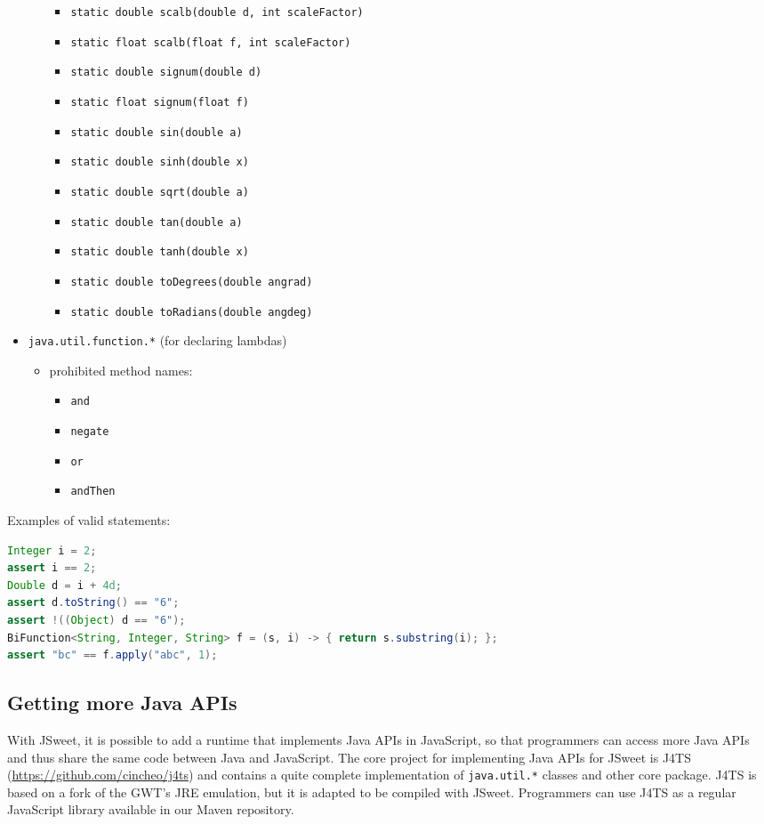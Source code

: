 \documentclass[a4paper]{report}
\begin{document}
\begin{itemize}
\begin{itemize}
\begin{itemize}
				\item \texttt{static double scalb(double d, int scaleFactor)}
				\item \texttt{static float scalb(float f, int scaleFactor)}
				\item \texttt{static double signum(double d)}
				\item \texttt{static float signum(float f)}
				\item \texttt{static double sin(double a)}
				\item \texttt{static double sinh(double x)}
				\item \texttt{static double sqrt(double a)}
				\item \texttt{static double tan(double a)}
				\item \texttt{static double tanh(double x)}
				\item \texttt{static double toDegrees(double angrad)}
				\item \texttt{static double toRadians(double angdeg)}
			\end{itemize}
	\end{itemize}
\item \texttt{java.util.function.*} (for declaring lambdas)
	\begin{itemize}
	\item prohibited method names: 
			\begin{itemize}
				\item \texttt{and}
				\item \texttt{negate} 
				\item \texttt{or}
				\item \texttt{andThen}
			\end{itemize}
	\end{itemize}
\end{itemize}

\noindent
Examples of valid statements:

\begin{lstlisting}[language=Java]
Integer i = 2;
assert i == 2;
Double d = i + 4d;
assert d.toString() == "6";
assert !((Object) d == "6");
BiFunction<String, Integer, String> f = (s, i) -> { return s.substring(i); };
assert "bc" == f.apply("abc", 1);
\end{lstlisting}

\subsection{Getting more Java APIs}

With JSweet, it is possible to add a runtime that implements Java APIs in JavaScript, so that programmers can access more Java APIs and thus share the same code between Java and JavaScript. The core project for implementing Java APIs for JSweet is J4TS (\url{https://github.com/cincheo/j4ts}) and contains a quite complete implementation of \texttt{java.util.*} classes and other core package. J4TS is based on a fork of the GWT's JRE emulation, but it is adapted to be compiled with JSweet. Programmers can use J4TS as a regular JavaScript library available in our Maven repository.
\end{document}
